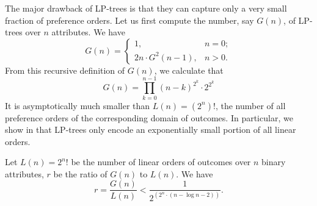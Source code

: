 The major drawback of LP-trees is that they can capture only a very small
fraction of preference orders. 
Let us first compute the number, say $G(n)$,
of LP-trees over $n$ attributes.
We have
\[
 G(n) =
  \begin{cases}
   1, & n=0; \\
   2n \cdot G^2(n-1), & n>0.
  \end{cases}
\]
From this recursive definition of $G(n)$, we calculate that
\begin{equation*}
	G(n)=\prod_{k=0}^{n-1} (n-k)^{2^k} \cdot 2^{2^k}
\end{equation*}
It is asymptotically much smaller than $L(n)=(2^n)!$, the number of all 
preference orders of the corresponding domain of outcomes. 
In particular, we show in  that
LP-trees only encode an exponentially small portion of all linear orders.
\begin{thm}
\label{thm:exp_small_ratio}
	Let $L(n)=2^n!$ be the number of linear orders of outcomes over $n$ binary attributes,
	$r$ be the ratio of $G(n)$ to $L(n)$.
	We have
	\begin{equation}
		r = \frac{G(n)}{L(n)} < \frac{1}{2^{(2^n \cdot (n-\log n -2))}}.
	\end{equation}
\end{thm}
